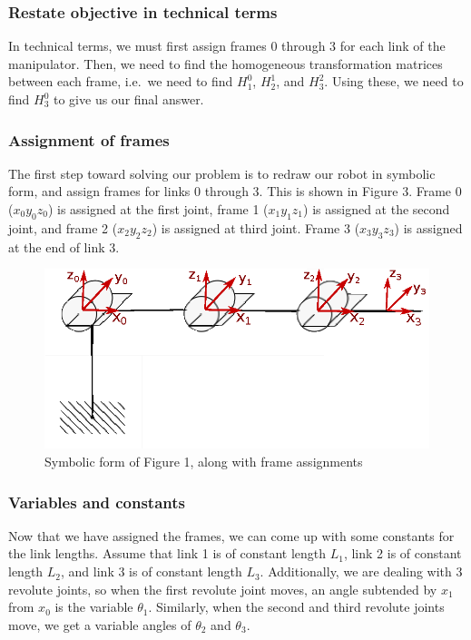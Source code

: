 \documentclass[conference]{IEEEtran}
\begin{document}
\subsubsection{Restate objective in technical terms}
In technical terms, we must first assign frames 0 through 3 for
each link of the manipulator. Then, we need to find the homogeneous
transformation matrices between each frame, i.e.\ we need to find
$H^0_1$, $H^1_2$, and $H^2_3$. Using these, we need to find $H^0_3$
to give us our final answer.

\subsubsection{Assignment of frames}
The first step toward solving our problem is to redraw our robot in symbolic
form, and assign frames for links 0 through 3. This is shown in
Figure 3. Frame 0 ($x_0 y_0 z_0$) is assigned at the first joint, frame 1
($x_1 y_1 z_1$) is assigned at the
second joint, and frame 2 ($x_2 y_2 z_2$)
 is assigned at third joint. Frame 3 ($x_3 y_3 z_3$) is assigned at
the end of link 3.\\
\begin{figure}[h]
    \centering
    \includegraphics[scale=0.8]{prob3_2_redraw}
    \caption{Symbolic form of Figure 1, along with frame assignments}
    \setlength{\belowcaptionskip}{-50pt}
\end{figure}
\subsubsection{Variables and constants}
Now that we have assigned the frames, we can come up with some constants for
the link lengths. Assume that link 1 is of constant length $L_1$, link 2 is 
of constant length $L_2$, and link 3 is of constant length $L_3$. Additionally,
we are dealing with 3 revolute joints, so when the first revolute joint moves,
an angle subtended by $x_1$ from $x_0$ is the variable $\theta_1$. Similarly,
when the second and third revolute joints move, we get a variable angles of
$\theta_2$ and $\theta_3$.
\end{document}
